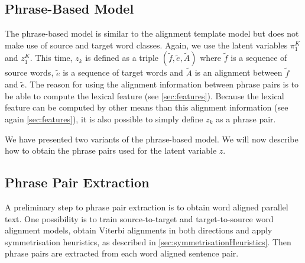 \subsection{Phrase-Based Model}

The phrase-based model is similar to the alignment template
model but does not make use of source and target word classes.
Again, we use the latent variables $\pi_1^K$ and $z_1^K$.
This time, $z_k$ is defined as a triple $(\tilde{f}, \tilde{e}, \tilde{A})$
where $\tilde{f}$ is a sequence of source words, $\tilde{e}$ is a sequence
of target words and $\tilde{A}$ is an alignment between $\tilde{f}$ and $\tilde{e}$.
The reason for using the alignment information between phrase pairs is to be able
to compute the lexical feature (see \autoref{sec:features}).
Because the lexical feature can be computed
by other means than this alignment
information (see again \autoref{sec:features}), it is also possible to simply
define $z_k$ as a phrase pair.

We have presented two variants of the phrase-based model. We will now
describe how to obtain the phrase pairs used for the latent variable $z$.

\subsection{Phrase Pair Extraction}
\label{sec:phrasextract}

A preliminary step to phrase pair extraction
is to obtain word aligned parallel text.
One possibility is to train source-to-target and
target-to-source word alignment models, obtain
Viterbi alignments in both directions and
apply symmetrisation heuristics, as described
in \autoref{sec:symmetrisationHeuristics}.
Then phrase pairs are extracted from each
word aligned sentence pair.

